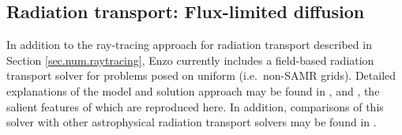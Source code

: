 \subsection{Radiation transport: Flux-limited diffusion}
\label{sec.num.rad-fld}


In addition to the ray-tracing approach for radiation transport
described in Section \ref{sec.num.raytracing}, Enzo currently includes
a field-based radiation transport solver for problems posed on uniform
(i.e.~non-SAMR grids).  Detailed explanations of the model and
solution approach may be found in
\cite{NBHBROW2007}, \cite{ReynoldsHayesPaschosNorman2009} and
\cite{NRS2009}, the salient features of which are reproduced here. 
In addition, comparisons of this solver with other astrophysical
radiation transport solvers may be found in \cite{IlievEtAl2009}.  

